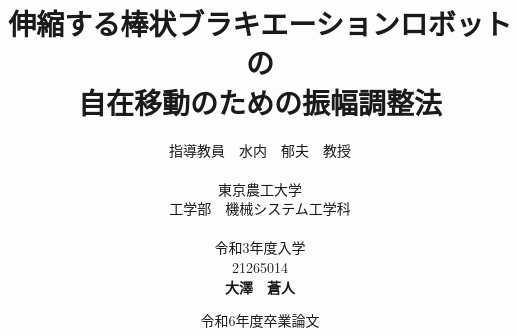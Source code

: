 


\usepackage{ikuo}%



\usepackage[dvipdfmx]{hyperref}  %
\usepackage{pxjahyper} %
\hypersetup{colorlinks=true}
\hypersetup{linkcolor=black}
\hypersetup{urlcolor=black}
\hypersetup{citecolor=black}

\usepackage{url} %

\newcommand{\FIGDIR}{./fig}        %


\date{令和6年度卒業論文}
\title{伸縮する棒状ブラキエーションロボットの\\自在移動のための振幅調整法}
\author{指導教員　水内　郁夫　教授 \\
\ \\
東京農工大学　\\
工学部　機械システム工学科　\\
\ \\
令和3年度入学\\
21265014\\
{\bf 大澤　蒼人}}


\setlength{\baselineskip}{20pt}
\maketitle
\tableofcontents








% 
% 
% 







